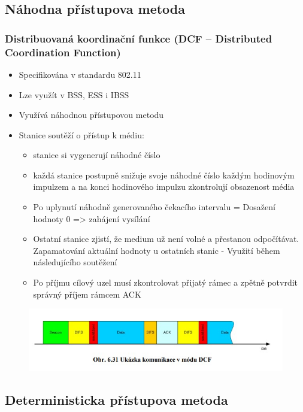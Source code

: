 \subsection{Náhodna přístupova metoda}
\subsubsection{Distribuovaná koordinační funkce (DCF – Distributed Coordination Function) }
\begin{itemize}
    \item Specifikována v standardu 802.11 
    \item Lze využít v BSS, ESS i IBSS 
    \item Využívá náhodnou přístupovou metodu
    \item Stanice soutěží o přístup k médiu: 
    \begin{itemize}
    \item stanice si vygenerují náhodné číslo
    \item každá stanice postupně snižuje svoje náhodné číslo každým hodinovým impulzem
a na konci hodinového impulzu zkontrolují obsazenost média
    \item Po uplynutí náhodně generovaného čekacího intervalu = Dosažení hodnoty 0 =>
zahájení vysílání
    \item Ostatní stanice zjistí, že medium už není volné a přestanou odpočítávat.
Zapamatování aktuální hodnoty u ostatních stanic - Využití během následujícího
soutěžení
    \item Po příjmu cílový uzel musí zkontrolovat přijatý rámec a zpětně potvrdit správný
příjem rámcem ACK
    \end{itemize}
\end{itemize}
\begin{figure}[ht]
\centering
  \begin{center}
    \includegraphics[scale=0.9]{images/dcf.jpg}
  \end{center}
\end{figure}

\subsection{Deterministicka přístupova metoda}

